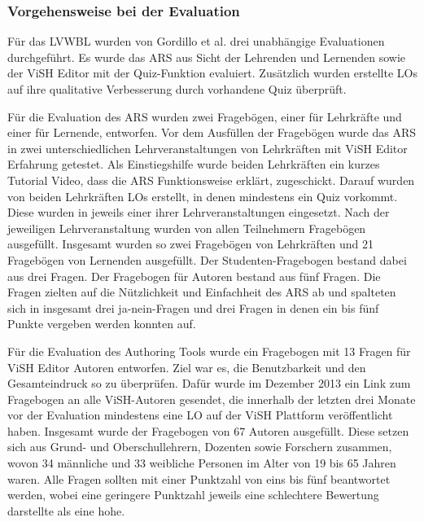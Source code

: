 \documentclass[conference]{IEEEtran}
\begin{document}
\subsubsection{Vorgehensweise bei der Evaluation}
Für das LVWBL wurden von Gordillo et al. drei unabhängige Evaluationen durchgeführt. Es wurde das ARS aus Sicht der Lehrenden und Lernenden sowie der ViSH Editor mit der Quiz-Funktion evaluiert. Zusätzlich wurden erstellte LOs auf ihre qualitative Verbesserung durch vorhandene Quiz überprüft. \cite[S. 5ff]{Gordillo2015}

Für die Evaluation des ARS wurden zwei Fragebögen, einer für Lehrkräfte und einer für Lernende, entworfen. Vor dem Ausfüllen der Fragebögen wurde das ARS in zwei unterschiedlichen Lehrveranstaltungen von Lehrkräften mit ViSH Editor Erfahrung getestet. Als Einstiegshilfe wurde beiden Lehrkräften ein kurzes Tutorial Video, dass die ARS Funktionsweise erklärt, zugeschickt. Darauf wurden von beiden Lehrkräften LOs erstellt, in denen mindestens ein Quiz vorkommt. Diese wurden in jeweils einer ihrer Lehrveranstaltungen eingesetzt. Nach der jeweiligen Lehrveranstaltung wurden von allen Teilnehmern Fragebögen ausgefüllt. Insgesamt wurden so zwei Fragebögen von Lehrkräften und 21 Fragebögen von Lernenden ausgefüllt. Der Studenten-Fragebogen bestand dabei aus drei Fragen. Der Fragebogen für Autoren bestand aus fünf Fragen. Die Fragen zielten auf die Nützlichkeit und Einfachheit des ARS ab und spalteten sich in insgesamt drei ja-nein-Fragen und drei Fragen in denen ein bis fünf Punkte vergeben werden konnten auf. \cite[S. 7]{Gordillo2015}

Für die Evaluation des Authoring Tools wurde ein Fragebogen mit 13 Fragen für ViSH Editor Autoren entworfen. Ziel war es, die Benutzbarkeit und den Gesamteindruck so zu überprüfen. Dafür wurde im Dezember 2013 ein Link zum Fragebogen an alle ViSH-Autoren gesendet, die innerhalb der letzten drei Monate vor der Evaluation mindestens eine LO auf der ViSH Plattform veröffentlicht haben. Insgesamt wurde der Fragebogen von 67 Autoren ausgefüllt. Diese setzen sich aus Grund- und Oberschullehrern, Dozenten sowie Forschern zusammen, wovon 34 männliche und 33 weibliche Personen im Alter von 19 bis 65 Jahren waren. Alle Fragen sollten mit einer Punktzahl von eins bis fünf beantwortet werden, wobei eine geringere Punktzahl jeweils eine schlechtere Bewertung darstellte als eine hohe. \cite[S. 5]{Gordillo2015}
\end{document}
